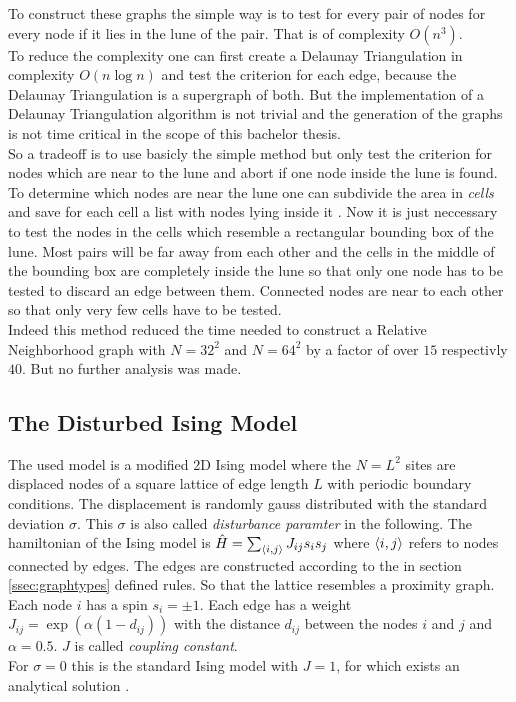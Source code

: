     To construct these graphs the simple way is to test for every
    pair of nodes for every node if it lies in the lune of the pair.
    That is of complexity \(O (n^3)\).\\
    To reduce the complexity one can first create a Delaunay
    Triangulation in complexity \(O (n \log n)\)
    \cite{Leach1992} and test the criterion for each edge, because
    the Delaunay Triangulation is a supergraph of both. But the
    implementation of a Delaunay Triangulation algorithm is not
    trivial and the generation of the graphs is not time critical in
    the scope of this bachelor thesis.\\
    So a tradeoff is to use basicly the simple method but only test
    the criterion for nodes which are near to the lune and abort if
    one node inside the lune is found. To determine which nodes are
    near the lune one can subdivide the area in \emph{cells} and save
    for each cell a list with nodes lying inside it \cite{RNGCell}.
    Now it is just neccessary to test the nodes in the cells which
    resemble a rectangular bounding box of the lune. Most pairs will be
    far away from each other and the cells in the middle of the bounding
    box are completely inside the lune so that only one node has to be
    tested to discard an edge between them. Connected nodes are near to
    each other so that only very few cells have to be tested.\\
    Indeed this method reduced the time needed to construct a Relative
    Neighborhood graph with \(N=32^2\) and \(N=64^2\) by a factor of
    over \(15\) respectivly \(40\). But no further analysis was made.

\subsection{The Disturbed Ising Model}
\label{ssec:isingmodel}
    The used model is a modified 2D Ising model where the \(N=L^2\) sites
    are displaced nodes of a square lattice of edge length \(L\) with
    periodic boundary conditions. The displacement is randomly gauss
    distributed with the standard deviation \(\sigma\). This \(\sigma\)
    is also called \emph{disturbance paramter} in the following.
    The hamiltonian of the Ising model is
    \(\hat{H} = \sum_{\left< i,j \right>}J_{ij}s_{i}s_{j}\)
    where \(\left< i,j \right>\) refers to nodes connected  by edges.
    The edges are constructed according to the in section
    \ref{ssec:graphtypes} defined rules. So that the lattice resembles a
    proximity graph. Each node \(i\) has a spin \(s_i = \pm 1\). Each
    edge has a weight \(J_{ij} = \exp (\alpha (1-d_{ij}))\) with the
    distance \(d_{ij}\) between the nodes \(i\) and \(j\) and
    \(\alpha = 0.5\). \(J\) is called \emph{coupling constant}.\\
    For \(\sigma = 0\) this is the standard Ising model with \(J = 1\),
    for which exists an analytical solution \cite{Onsager1944}.\\

